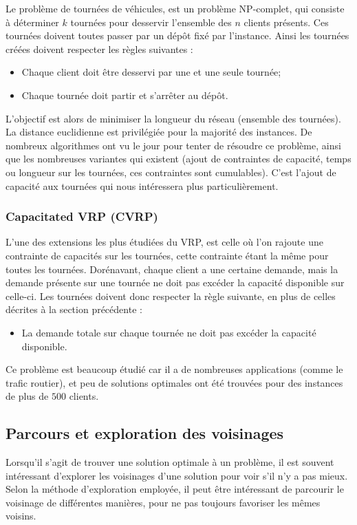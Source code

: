 \documentclass[a4paper,11pt]{article}%
\begin{document}
Le problème de tournées de véhicules, est un problème NP-complet, qui consiste à déterminer $k$ tournées pour desservir l'ensemble des $n$ clients présents.  Ces tournées doivent toutes passer par un dépôt fixé par l'instance. 
Ainsi les tournées créées doivent respecter les règles suivantes :
\begin{itemize}
\item Chaque client doit être desservi par une et une seule tournée;
\item Chaque tournée doit partir et s'arrêter au dépôt.
\end{itemize}
L'objectif est alors de minimiser la longueur du réseau (ensemble des tournées). La distance euclidienne est privilégiée pour la majorité des instances.
De nombreux algorithmes ont vu le jour pour tenter de résoudre ce problème, ainsi que les nombreuses variantes qui existent (ajout de contraintes de capacité, temps ou longueur sur les tournées, ces contraintes sont cumulables). 
C'est l'ajout de capacité aux tournées qui nous intéressera plus particulièrement.

\subsubsection{Capacitated VRP (CVRP)}

L'une des extensions les plus étudiées du VRP, est celle où l'on rajoute une contrainte de capacités sur les tournées, cette contrainte étant la même pour toutes les tournées. 
Dorénavant, chaque client a une certaine demande, mais la demande présente sur une tournée ne doit pas excéder la capacité disponible sur celle-ci.
Les tournées doivent donc respecter la règle suivante, en plus de celles décrites à la section précédente :
\begin{itemize}
\item La demande totale sur chaque tournée ne doit pas excéder la capacité disponible.
\end{itemize}
Ce problème est beaucoup étudié car il a de nombreuses applications (comme le trafic routier), et peu de solutions optimales ont été trouvées pour des instances de plus de $500$ clients. 


\subsection{Parcours et exploration des voisinages}
\label{voisinage}

Lorsqu'il s'agit de trouver une solution optimale à un problème, il est souvent intéressant d'explorer les voisinages d'une solution pour voir s'il n'y a pas mieux. Selon la méthode d'exploration employée, il peut être intéressant de parcourir le voisinage de différentes manières, pour ne pas toujours favoriser les mêmes voisins.
\end{document}
